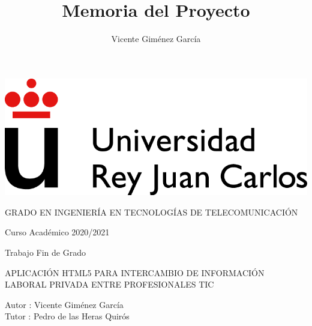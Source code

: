 \documentclass[a4paper, 12pt]{book}
\title{Memoria del Proyecto}
\author{Vicente Giménez García}
\begin{document}
    \renewcommand{\refname}{Bibliografía}  %
    \renewcommand{\appendixname}{Apéndice}


    \begin{titlepage}
        \begin{center}
            \includegraphics[scale=0.8]{img/URJ_logo_Color_POS.png}

            \vspace{1.75cm}

            \Large
            GRADO EN INGENIERÍA EN TECNOLOGÍAS DE TELECOMUNICACIÓN

            \vspace{0.4cm}

            \large
            Curso Académico 2020/2021

            \vspace{0.8cm}

            Trabajo Fin de Grado

            \vspace{2.5cm}

            \LARGE
            APLICACIÓN HTML5 PARA INTERCAMBIO DE INFORMACIÓN LABORAL PRIVADA ENTRE PROFESIONALES TIC

            \vspace{4cm}

            \large
            Autor : Vicente Giménez García \\
            Tutor : Pedro de las Heras Quirós
        \end{center}
    \end{titlepage}

    \newpage
    \mbox{}
    \thispagestyle{empty} %


    \clearpage
\end{document}
